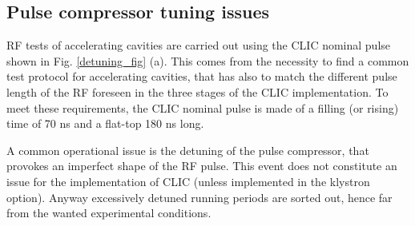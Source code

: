 \subsection[Pulse compressor tuning issues]{Pulse compressor tuning issues}
\label{sec:PCtune}

RF tests of accelerating cavities are carried out using the CLIC nominal pulse shown in Fig. \ref{detuning_fig} (a). This comes from the necessity to find a common test protocol for accelerating cavities, that has also to match the different pulse length of the RF foreseen in the three stages of the CLIC implementation. To meet these requirements, the CLIC nominal pulse is made of a filling (or rising) time of 70 ns and a flat-top 180 ns long.

A common operational issue is the detuning of the pulse compressor, that provokes an imperfect shape of the RF pulse. This event does not constitute an issue for the implementation of CLIC (unless implemented in the klystron option). Anyway excessively detuned running periods are sorted out, hence far from the wanted experimental conditions. 

